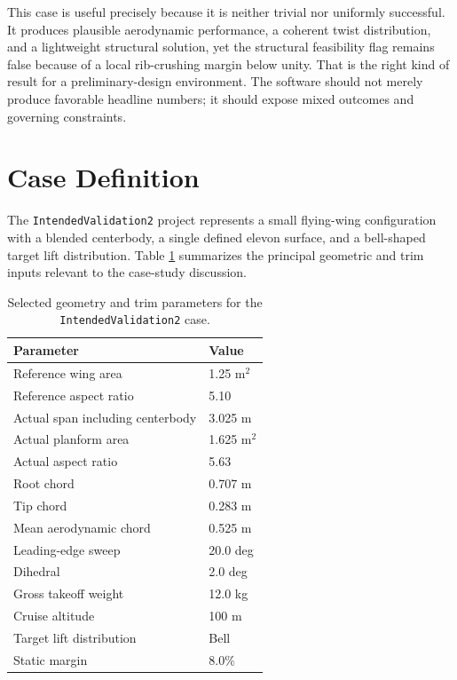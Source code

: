 \documentclass[12pt]{report}
\begin{document}
This case is useful precisely because it is neither trivial nor uniformly successful. It produces plausible aerodynamic performance, a coherent twist distribution, and a lightweight structural solution, yet the structural feasibility flag remains false because of a local rib-crushing margin below unity. That is the right kind of result for a preliminary-design environment. The software should not merely produce favorable headline numbers; it should expose mixed outcomes and governing constraints.

\section{Case Definition}
The \texttt{IntendedValidation2} project represents a small flying-wing configuration with a blended centerbody, a single defined elevon surface, and a bell-shaped target lift distribution. Table \ref{tab:intendedvalidation2-geometry} summarizes the principal geometric and trim inputs relevant to the case-study discussion.

\begin{table}[htbp]
\centering
\caption{Selected geometry and trim parameters for the \texttt{IntendedValidation2} case.}
\label{tab:intendedvalidation2-geometry}
\begin{tabular}{ll}
\toprule
\textbf{Parameter} & \textbf{Value} \\
\midrule
Reference wing area & 1.25 m\(^2\) \\
Reference aspect ratio & 5.10 \\
Actual span including centerbody & 3.025 m \\
Actual planform area & 1.625 m\(^2\) \\
Actual aspect ratio & 5.63 \\
Root chord & 0.707 m \\
Tip chord & 0.283 m \\
Mean aerodynamic chord & 0.525 m \\
Leading-edge sweep & 20.0 deg \\
Dihedral & 2.0 deg \\
Gross takeoff weight & 12.0 kg \\
Cruise altitude & 100 m \\
Target lift distribution & Bell \\
Static margin & 8.0\% \\
\bottomrule
\end{tabular}
\end{table}
\end{document}
